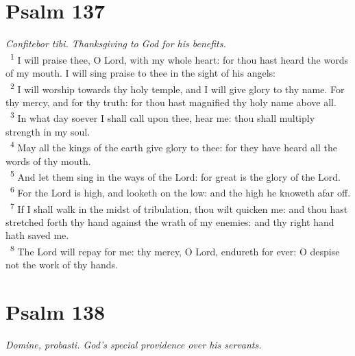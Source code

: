 \documentclass[a5paper,12pt]{article}
\begin{document}
\begin{multicols*}{2}
\section{Psalm 137}
\label{sec:org4f56b82}
\emph{Confitebor tibi. Thanksgiving to God for his benefits.}\\

~\textsuperscript{1} I will praise thee, O Lord, with my whole heart: for thou hast heard the words of my mouth. I will sing praise to thee in the sight of his angels:\\
~\textsuperscript{2} I will worship towards thy holy temple, and I will give glory to thy name. For thy mercy, and for thy truth: for thou hast magnified thy holy name above all.\\
~\textsuperscript{3} In what day soever I shall call upon thee, hear me: thou shall multiply strength in my soul.\\
~\textsuperscript{4} May all the kings of the earth give glory to thee: for they have heard all the words of thy mouth.\\
~\textsuperscript{5} And let them sing in the ways of the Lord: for great is the glory of the Lord.\\
~\textsuperscript{6} For the Lord is high, and looketh on the low: and the high he knoweth afar off.\\
~\textsuperscript{7} If I shall walk in the midst of tribulation, thou wilt quicken me: and thou hast stretched forth thy hand against the wrath of my enemies: and thy right hand hath saved me.\\
~\textsuperscript{8} The Lord will repay for me: thy mercy, O Lord, endureth for ever: O despise not the work of thy hands.\\

\section{Psalm 138}
\label{sec:orgf3b637c}
\emph{Domine, probasti. God's special providence over his servants.}\\


\end{multicols*}
\end{document}
